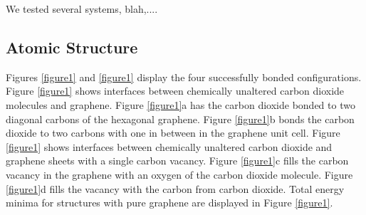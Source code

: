 \documentclass[journal=jacsat,manuscript=article]{achemso}
\begin{document}
We tested several systems, blah,....


\subsection{Atomic Structure}

Figures \ref{figure1} and \ref{figure1} display the four successfully bonded configurations. 
Figure \ref{figure1} shows interfaces between chemically unaltered carbon dioxide molecules and graphene. 
Figure \ref{figure1}a has the carbon dioxide bonded to two diagonal carbons of the hexagonal graphene. 
Figure \ref{figure1}b bonds the carbon dioxide to two carbons with one in between in the graphene unit cell. 
Figure \ref{figure1} shows interfaces between chemically unaltered carbon dioxide and graphene sheets with a single carbon vacancy. 
Figure \ref{figure1}c fills the carbon vacancy in the graphene with an oxygen of the carbon dioxide molecule. 
Figure \ref{figure1}d fills the vacancy with the carbon from carbon dioxide. 
Total energy minima for structures with pure graphene are displayed in Figure \ref{figure1}.
\end{document}
